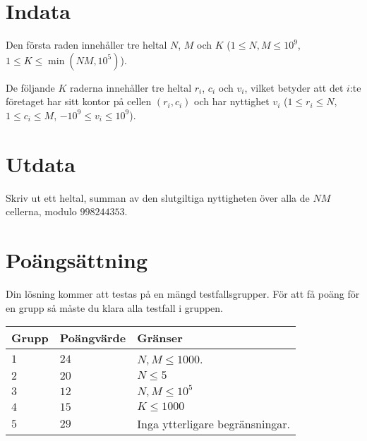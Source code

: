 \section*{Indata}
Den första raden innehåller tre heltal $N$, $M$ och $K$ ($1 \leq N,M \leq 10^9$, $1 \leq K \leq \min(NM, 10^5)$).

De följande $K$ raderna innehåller tre heltal $r_i$, $c_i$ och $v_i$, vilket betyder att det $i$:te företaget har sitt
kontor på cellen $(r_i, c_i)$ och har nyttighet $v_i$ ($1 \leq r_i \leq N$, $1 \leq c_i \leq M$, $-10^9 \leq v_i \leq 10^9$).

\section*{Utdata}
Skriv ut ett heltal, summan av den slutgiltiga nyttigheten över alla de $NM$ cellerna, modulo $998244353$.

\section*{Poängsättning}
Din lösning kommer att testas på en mängd testfallsgrupper.
För att få poäng för en grupp så måste du klara alla testfall i gruppen.

\noindent
\begin{tabular}{| l | l | l |}
\hline
Grupp & Poängvärde & Gränser \\ \hline
$1$   & $24$       & $N,M \leq 1000$. \\ \hline
$2$   & $20$       & $N \leq 5$ \\ \hline
$3$   & $12$       & $N,M \leq 10^5$ \\ \hline
$4$   & $15$       & $K \leq 1000$ \\ \hline
$5$   & $29$       & Inga ytterligare begränsningar. \\ \hline

\end{tabular}
